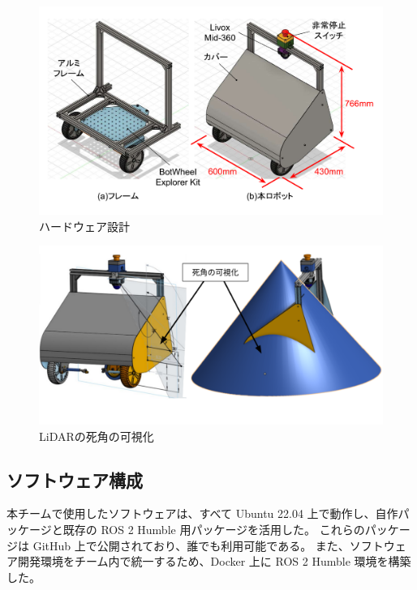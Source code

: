 \documentclass[twocolumn,9pt]{jsproceedings}
\begin{document}
\begin{figure}[h]
  \begin{center}
    \includegraphics[width=1.0\linewidth]{figs/robot_flame.pdf}
    \caption{ハードウェア設計}
    \label{fig:trainee_flame}
  \end{center}
\end{figure}

\begin{figure}[h]
  \begin{center}
    \includegraphics[width=1.0\linewidth]{figs/lidar_position_onshape.pdf}
    \caption{LiDARの死角の可視化}
    \label{fig:lidar_pos}
  \end{center}
\end{figure}

\subsection{ソフトウェア構成}\label{sub:software}

本チームで使用したソフトウェアは、すべて Ubuntu 22.04 上で動作し、自作パッケージと既存の ROS 2 Humble 用パッケージを活用した。
これらのパッケージは GitHub 上で公開されており、誰でも利用可能である。
また、ソフトウェア開発環境をチーム内で統一するため、Docker 上に ROS 2 Humble 環境を構築した。
\end{document}
